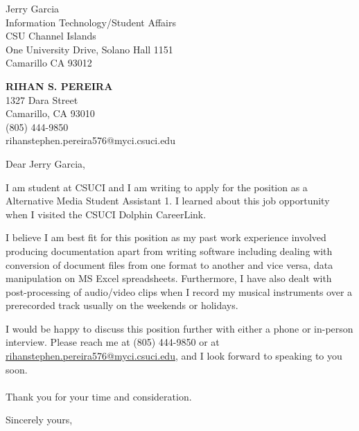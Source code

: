 \documentclass[11pt]{letter} %
\begin{document}
\signature{\vspace{-40pt} Rihan Pereira}                  %
\longindentation=0pt                       %
\let\raggedleft\raggedright                %
 
\begin{letter}{Jerry Garcia\\
Information Technology/Student Affairs \\
CSU Channel Islands \\
One University Drive, Solano Hall 1151 \\
Camarillo CA 93012}

\begin{center}
\large\textbf{RIHAN S. PEREIRA}\\
1327 Dara Street \\ Camarillo, CA 93010 \\ (805) 444-9850 \\ rihanstephen.pereira576@myci.csuci.edu
\end{center} 
\vfill %

 
\opening{Dear Jerry Garcia,} 
 
\noindent I am student at CSUCI and I am writing to apply for the position as a Alternative Media Student Assistant 1. I learned about this job opportunity when I visited the CSUCI Dolphin CareerLink.

\noindent I believe I am best fit for this position as my past work experience involved producing documentation apart from writing software including dealing with conversion of document files from one format to another and vice versa, data manipulation on MS Excel spreadsheets. Furthermore, I have also dealt with post-processing of audio/video clips when I record my musical instruments over a prerecorded track usually on the weekends or holidays.

I would be happy to discuss this position further with either a phone or in-person interview.
Please reach me at (805) 444-9850 or at \href{rihanstephen.pereira576@myci.csuci.edu}{\underline{rihanstephen.pereira576@myci.csuci.edu}}, and I look forward to
speaking to you soon.
\\
\\
Thank you for your time and consideration.

 
\closing{Sincerely yours,}
 
 

\end{letter}
 
\end{document}
